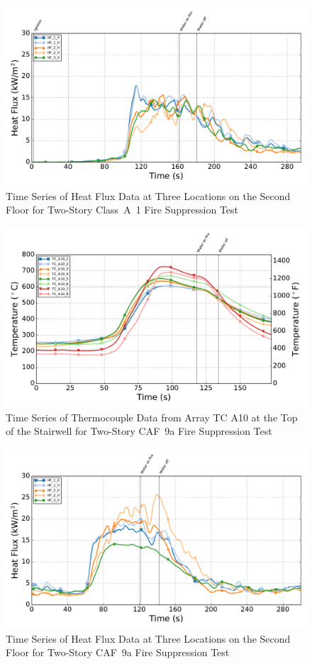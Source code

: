 \documentclass[12pt,oneside]{book}
\begin{document}
\begin{figure}[!ht]
	\includegraphics[width=.85\columnwidth]{../Figures/Script_Figures/Test_41a_West_061415_Heat_Flux}
	\caption{Time Series of Heat Flux Data at Three Locations on the Second Floor for Two-Story Class~A~1 Fire Suppression Test}
	\label{fig:app_classa1_hf}
\end{figure}

\begin{figure}[!ht]
	\includegraphics[width=.85\columnwidth]{../Figures/Script_Figures/Test_41_West_061415_TC_A10}
	\caption{Time Series of Thermocouple Data from Array TC A10 at the Top of the Stairwell for Two-Story CAF~9a Fire Suppression Test}
	\label{fig:app_caf9a_tca10}
\end{figure}

\begin{figure}[!ht]
	\includegraphics[width=.85\columnwidth]{../Figures/Script_Figures/Test_41_West_061415_Heat_Flux}
	\caption{Time Series of Heat Flux Data at Three Locations on the Second Floor for Two-Story CAF~9a Fire Suppression Test}
	\label{fig:app_caf9a_hf}
\end{figure}
\end{document}
